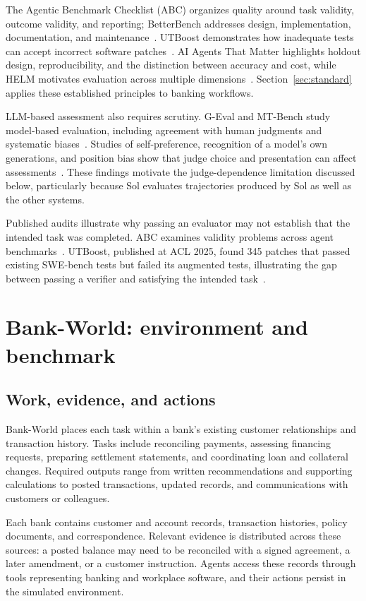 \documentclass[11pt,letterpaper]{article}
\begin{document}
The Agentic Benchmark Checklist (ABC) organizes quality around task validity, outcome validity, and reporting; BetterBench addresses design, implementation, documentation, and maintenance~\cite{abc,betterbench}. UTBoost demonstrates how inadequate tests can accept incorrect software patches~\cite{utboost}. AI Agents That Matter highlights holdout design, reproducibility, and the distinction between accuracy and cost, while HELM motivates evaluation across multiple dimensions~\cite{agentsmatter,helm}. Section~\ref{sec:standard} applies these established principles to banking workflows.

LLM-based assessment also requires scrutiny. G-Eval and MT-Bench study model-based evaluation, including agreement with human judgments and systematic biases~\cite{geval,mtbench}. Studies of self-preference, recognition of a model's own generations, and position bias show that judge choice and presentation can affect assessments~\cite{selfpreference,selfrecognition,positionbias}. These findings motivate the judge-dependence limitation discussed below, particularly because Sol evaluates trajectories produced by Sol as well as the other systems.

Published audits illustrate why passing an evaluator may not establish that the intended task was completed. ABC examines validity problems across agent benchmarks~\cite{abc}. UTBoost, published at ACL 2025, found 345 patches that passed existing SWE-bench tests but failed its augmented tests, illustrating the gap between passing a verifier and satisfying the intended task~\cite{utboost}.

\section{Bank-World: environment and benchmark}\label{sec:benchmark}
\subsection{Work, evidence, and actions}
Bank-World places each task within a bank's existing customer relationships and transaction history. Tasks include reconciling payments, assessing financing requests, preparing settlement statements, and coordinating loan and collateral changes. Required outputs range from written recommendations and supporting calculations to posted transactions, updated records, and communications with customers or colleagues.

Each bank contains customer and account records, transaction histories, policy documents, and correspondence. Relevant evidence is distributed across these sources: a posted balance may need to be reconciled with a signed agreement, a later amendment, or a customer instruction. Agents access these records through tools representing banking and workplace software, and their actions persist in the simulated environment.
\end{document}
